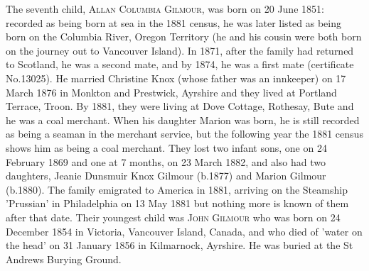 The seventh child, \textsc{Allan Columbia Gilmour}, was born on 20 June 1851: recorded as being born at sea in the 1881 census, he was later listed as being born on the Columbia River, Oregon Territory (he and his cousin were both born on the journey out to Vancouver Island). In 1871, after the family had returned to Scotland, he was a second mate, and by 1874, he was a first mate (certificate No.13025). He married Christine Knox (whose father was an innkeeper) on 17 March 1876 in Monkton and Prestwick, Ayrshire and they lived at Portland Terrace, Troon. By 1881, they were living at Dove Cottage, Rothesay, Bute and he was a coal merchant.   When his daughter Marion was born, he is still recorded as being a seaman in the merchant service, but the following year the 1881 census shows him as being a coal merchant. They lost two infant sons, one on 24 February 1869 and one at 7 months, on 23 March 1882, and also had two daughters, Jeanie Dunsmuir Knox Gilmour (b.1877) and Marion Gilmour (b.1880). The family emigrated to America in 1881, arriving on the Steamship 'Prussian' in Philadelphia on 13 May 1881 but nothing more is known of them after that date.
Their youngest child was \textsc{John Gilmour} who was born on 24 December 1854 in Victoria, Vancouver Island, Canada, and who died of 'water on the head' on 31 January 1856 in Kilmarnock, Ayrshire. He was buried at the St Andrews Burying Ground.



  

